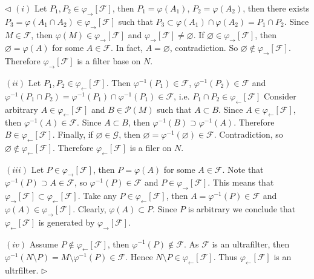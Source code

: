 \documentclass[12pt]{article}
\newenvironment{proof}{\par $\triangleleft$}{$\triangleright$}
\begin{document}
\begin{proof} $(i)$ Let $P_1,P_2\in\varphi_{\rightarrow}[\mathcal{F}]$, then
    $P_1=\varphi(A_1)$, $P_2=\varphi(A_2)$, then there exists
    $P_3=\varphi(A_1\cap A_2)\in\varphi_{\rightarrow}[\mathcal{F}]$ such that
    $P_3\subset\varphi(A_1)\cap\varphi(A_2)=P_1\cap P_2$. Since
    $M\in\mathcal{F}$, then $\varphi(M)\in\varphi_{\rightarrow}[\mathcal{F}]$
    and $\varphi_{\rightarrow}[\mathcal{F}]\neq\varnothing$. If
    $\varnothing\in\varphi_{\rightarrow}[\mathcal{F}]$, then
    $\varnothing=\varphi(A)$ for some $A\in\mathcal{F}$. In fact,
    $A=\varnothing$, contradiction. So
    $\varnothing\notin\varphi_{\rightarrow}[\mathcal{F}]$. Therefore
    $\varphi_{\rightarrow}[\mathcal{F}]$ is a filter base on $N$.

    $(ii)$ Let $P_1,P_2\in\varphi_{\leftarrow}[\mathcal{F}]$. Then
    $\varphi^{-1}(P_1)\in\mathcal{F}$, $\varphi^{-1}(P_2)\in\mathcal{F}$ and
    $\varphi^{-1}(P_1\cap
        P_2)=\varphi^{-1}(P_1)\cap\varphi^{-1}(P_1)\in\mathcal{F}$, i.e.
    $P_1\cap P_2\in\varphi_{\leftarrow}[\mathcal{F}]$ Consider arbitrary
    $A\in\varphi_{\leftarrow}[\mathcal{F}]$ and $B\in\mathcal{P}(M)$ such that
    $A\subset B$. Since $A\in\varphi_{\leftarrow}[\mathcal{F}]$, then
    $\varphi^{-1}(A)\in\mathcal{F}$. Since $A\subset B$, then
    $\varphi^{-1}(B)\supset\varphi^{-1}(A)$. Therefore
    $B\in\varphi_{\leftarrow}[\mathcal{F}]$. Finally, if
    $\varnothing\in\mathcal{G}$, then
    $\varnothing=\varphi^{-1}(\varnothing)\in\mathcal{F}$. Contradiction, so
    $\varnothing\notin\varphi_{\leftarrow}[\mathcal{F}]$. Therefore
    $\varphi_{\leftarrow}[\mathcal{F}]$ is a filer on $N$.

    $(iii)$ Let $P\in\varphi_{\rightarrow}[\mathcal{F}]$, then $P=\varphi(A)$
    for some $A\in\mathcal{F}$. Note that $\varphi^{-1}(P)\supset
        A\in\mathcal{F}$, so $\varphi^{-1}(P)\in\mathcal{F}$ and
    $P\in\varphi_{\rightarrow}[\mathcal{F}]$. This means that
    $\varphi_{\rightarrow}[\mathcal{F}]\subset
        \varphi_{\leftarrow}[\mathcal{F}]$. Take any $P\in
        \varphi_{\leftarrow}[\mathcal{F}]$, then
    $A=\varphi^{-1}(P)\in\mathcal{F}$ and
    $\varphi(A)\in\varphi_{\rightarrow}[\mathcal{F}]$. Clearly,
    $\varphi(A)\subset P$. Since $P$ is arbitrary we conclude that
    $\varphi_{\leftarrow}[\mathcal{F}]$ is generated by
    $\varphi_{\rightarrow}[\mathcal{F}]$.

    $(iv)$ Assume $P\notin\varphi_{\leftarrow}[\mathcal{F}]$, then
    $\varphi^{-1}(P)\notin\mathcal{F}$. As $\mathcal{F}$ is an ultrafilter, then
    $\varphi^{-1}(N\setminus P)=M\setminus\varphi^{-1}(P)\in\mathcal{F}$. Hence
    $N\setminus P\in\varphi_{\leftarrow}[\mathcal{F}]$. Thus
    $\varphi_{\leftarrow}[\mathcal{F}]$ is an ultrfilter.
\end{proof}
\end{document}
